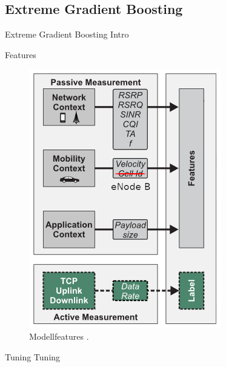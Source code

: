\subsection{Extreme Gradient Boosting}

\begin{frame}{Extreme Gradient Boosting}
    Intro
\end{frame}

\begin{frame}{Features}
    \begin{figure}[h]
		\centering
		\includegraphics[height=0.75\textheight]{grafiken/features}
		\caption{Modellfeatures \cite{IEEE}.}
		\label{features}
	\end{figure}
\end{frame}

\begin{frame}{Tuning}
    Tuning
\end{frame}

